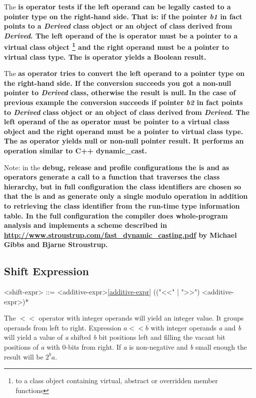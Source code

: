 \documentclass[a4paper,oneside,11pt]{article}
\begin{document}
The \bf{is} operator tests if the left operand can be legally casted to a pointer type on the right-hand side.
That is: if the pointer \emph{b1} in fact points to a \emph{Derived} class object or an object of class derived from \emph{Derived}.
The left operand of the \bf{is} operator must be a pointer to a virtual class object
\footnote{to a class object containing virtual, abstract or overridden member functions}
and the right operand must be a pointer to virtual class type. The \bf{is} operator yields a Boolean result.

The \bf{as} operator tries to convert the left operand to a pointer type on the right-hand side.
If the conversion succeeds you got a non-null pointer to \emph{Derived} class, otherwise the result is \bf{null}.
In the case of previous example the conversion succeeds if pointer \emph{b2} in fact points to \emph{Derived} class object or an object of class derived
from \emph{Derived}.
The left operand of the \bf{as} operator must be pointer to a virtual class object and the right operand must be a pointer to virtual class type.
The \bf{as} operator yields \bf{null} or non-null pointer result. It performs an operation similar to C++ \bf{dynamic\_cast}.

Note: in the \bf{debug}, \bf{release} and \bf{profile} configurations the \bf{is} and \bf{as} operators generate a call to a function
that traverses the class hierarchy, but in \bf{full} configuration the class identifiers are chosen so that the \bf{is} and \bf{as} generate only
a single modulo operation in addition to retrieving the class identifier from the run-time type information table.
In the \bf{full} configuration the compiler does whole-program analysis and implements a scheme described in
\url {http://www.stroustrup.com/fast_dynamic_casting.pdf} by Michael Gibbs and Bjarne Stroustrup.

\subsection{Shift Expression}

\begin{grammar}
\label{shift-expr}<shift-expr> ::= <additive-expr>\ref{additive-expr} (("<<" | ">>") <additive-expr>)*
\end{grammar}

The $<<$ operator with integer operands will yield an integer value. It groups operands from left to right.
Expression $a << b$ with integer operands \emph{a} and \emph{b} will yield a value of \emph{a} shifted \emph{b} bit positions left and
filling the vacant bit positions of \emph{a} with 0-bits from right.
If \emph{a} is non-negative and \emph{b} small enough the result will be $2^ba$.
\end{document}
